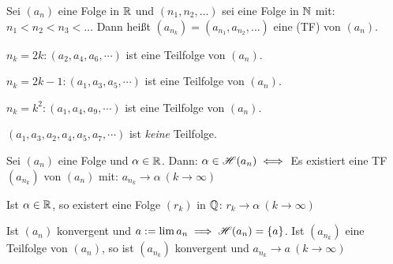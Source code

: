 \documentclass[a4paper,oneside,DIV15,BCOR12mm]{scrbook}
\begin{document}
\begin{definition}[Teilfolge]
Sei $(a_n)$ eine Folge in $\mathbb{R}$ und $(n_1,n_2,\ldots)$ sei eine Folge in $\mathbb{N}$ mit: $n_1<n_2<n_3<\ldots$ Dann heißt $(a_{n_k}) = (a_{n_1}, a_{n_2},\ldots)$ eine  (TF) von $(a_n)$.
\end{definition}

\begin{beispiele}
\item $n_k=2k: (a_2, a_4, a_6, \cdots)$ ist eine Teilfolge von $(a_n)$.
\item $n_k=2k-1: (a_1, a_3, a_5, \cdots)$ ist eine Teilfolge von $(a_n)$.
\item $n_k=k^2: (a_1, a_4, a_9, \cdots)$ ist eine Teilfolge von $(a_n)$.
\item $(a_1, a_3, a_2, a_4, a_5, a_7, \cdots)$ ist \emph{keine} Teilfolge.
\end{beispiele}

\begin{satz}
\begin{liste}
\item Sei $(a_n)$ eine Folge und $\alpha \in\mathbb{R}$. Dann: $\alpha \in \mathscr{H}(a_n) \iff$ Es existiert eine TF $(a_{n_k})$ von $(a_n)$ mit: $a_{n_k} \to \alpha\ (k \to \infty)$
\item Ist $\alpha \in \mathbb{R}$, so existert eine Folge $(r_k)$ in $\mathbb{Q}$: $r_k \to \alpha \ (k\to\infty)$
\item Ist $(a_n)$ konvergent und $a:=\lim a_n \implies \mathscr{H}(a_n) = \{a\}$. Ist $(a_{n_k})$ eine Teilfolge von $(a_n)$, so ist $(a_{n_k})$ konvergent und $a_{n_k} \to a\ (k \to \infty)$
\end{liste}
\end{satz}
\end{document}
